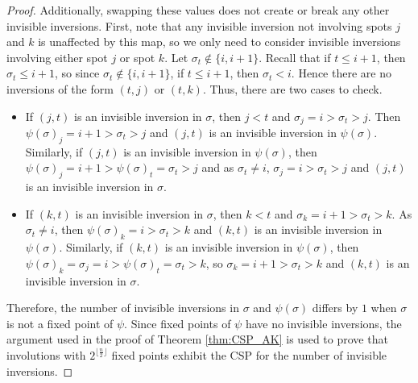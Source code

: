 \documentclass[10pt,a4paper]{amsart}
\begin{document}
\begin{proof}
  Additionally, swapping these values does not create or break any other invisible inversions. First, note that any invisible inversion not involving spots $j$ and $k$ is unaffected by this map, so we only need to consider invisible inversions involving either spot $j$ or spot $k$.  Let $\sigma_t \notin \{i, i+1\}$. Recall that if $t \leq i + 1$, then $\sigma_t \leq i + 1$, so since $\sigma_t \notin \{i, i + 1\}$, if $t \leq i + 1$, then $\sigma_t < i$.
  Hence there are no inversions of the form $(t, j)$ or $(t, k)$. Thus, there are two cases to check.

  \begin{itemize}

    \item If $(j, t)$ is an invisible inversion in $\sigma$, then $j < t$ and $\sigma_j = i > \sigma_t > j$. Then $\psi(\sigma)_j = i + 1 > \sigma_t > j$ and $(j, t)$ is an invisible inversion in $\psi(\sigma)$. Similarly, if $(j, t)$ is an invisible inversion in $\psi(\sigma)$, then $\psi(\sigma)_j = i + 1 > \psi(\sigma)_t = \sigma_t > j$ and as $\sigma_t \neq i$, $\sigma_j = i > \sigma_t > j$ and $(j, t)$ is an invisible inversion in $\sigma$.

    \item If $(k, t)$ is an invisible inversion in $\sigma$, then $k < t$ and $\sigma_k = i + 1 > \sigma_t > k$. As $\sigma_t \neq i$, then $\psi(\sigma)_k = i > \sigma_t > k$ and $(k, t)$ is an invisible inversion in $\psi(\sigma)$. Similarly, if $(k, t)$ is an invisible inversion in $\psi(\sigma)$, then $\psi(\sigma)_k = \sigma_j = i  > \psi(\sigma)_t = \sigma_t > k$, so $\sigma_k = i + 1 > \sigma_t > k$ and $(k, t)$ is an invisible inversion in $\sigma$.

\end{itemize}
Therefore, the number of invisible inversions in $\sigma$ and $\psi(\sigma)$ differs by $1$ when $\sigma$ is not a fixed point of $\psi$. Since fixed points of $\psi$ have no invisible inversions, the argument used in the proof of Theorem \ref{thm:CSP_AK} is used to prove that involutions with $2^{\lfloor \frac{n}{2}\rfloor}$ fixed points exhibit the CSP for the number of invisible inversions.
\end{proof}
\end{document}
